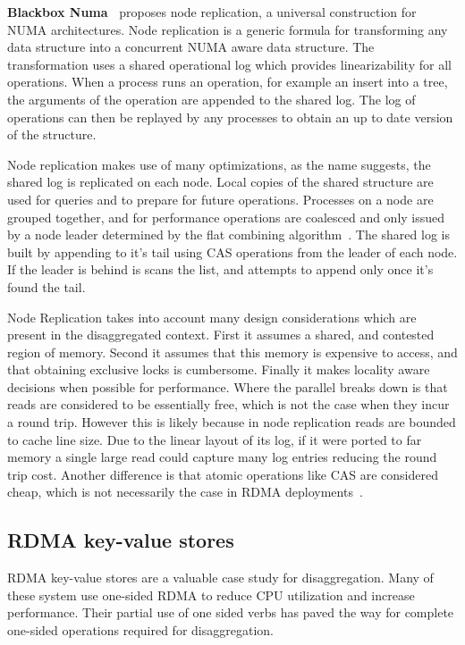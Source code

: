 \textbf{Blackbox Numa~\cite{black-box-numa}} proposes node replication, a
universal construction for NUMA architectures. Node replication is a generic
formula for transforming any data structure into a concurrent NUMA aware data
structure. The transformation uses a shared operational log which provides
linearizability for all operations. When a process runs an operation, for
example an insert into a tree, the arguments of the operation are appended to
the shared log. The log of operations can then be replayed by any processes to
obtain an up to date version of the structure.

Node replication makes use of many optimizations, as the name suggests, the
shared log is replicated on each node. Local copies of the shared structure are
used for queries and to prepare for future operations. Processes on a node are
grouped together, and for performance operations are coalesced and only issued
by a node leader determined by the flat combining algorithm~\cite{flat-combine}.
The shared log is built by appending to it's tail using CAS operations from the
leader of each node. If the leader is behind is scans the list, and attempts to
append only once it's found the tail.

Node Replication takes into account many design considerations which are present
in the disaggregated context. First it assumes a shared, and contested region of
memory. Second it assumes that this memory is expensive to access, and that
obtaining exclusive locks is cumbersome. Finally it makes locality aware
decisions when possible for performance. Where the parallel breaks down is that
reads are considered to be essentially free, which is not the case when they
incur a round trip. However this is likely because in node replication reads are
bounded to cache line size. Due to the linear layout of its log, if it were
ported to far memory a single large read could capture many log entries reducing
the round trip cost. Another difference is that atomic operations like CAS are
considered cheap, which is not necessarily the case in RDMA
deployments~\cite{design-guidelines}.


\subsection{RDMA key-value stores}

RDMA key-value stores are a valuable case study for disaggregation. Many of
these system use one-sided RDMA to reduce CPU utilization and increase
performance. Their partial use of one sided verbs has paved the way for complete
one-sided operations required for disaggregation.


